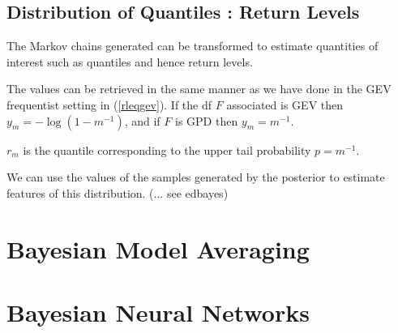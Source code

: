 \subsection{Distribution of Quantiles : Return Levels}

The Markov chains generated can be transformed to estimate quantities of interest such as quantiles and hence return levels.

The values can be retrieved in the same manner as we have done in the GEV frequentist setting in (\ref{rleqgev}). If the df $F$ associated is GEV then $y_m = -\log(1-m^{-1})$, and if $F$ is GPD then $y_m=m^{-1}$.

$r_m$ is the quantile corresponding to the upper tail probability $p=m^{-1}$. 

We can use the values of the samples generated by the posterior to estimate features of this distribution. (... see edbayes)
 
 

\section{Bayesian Model Averaging}




\section{Bayesian Neural Networks}

